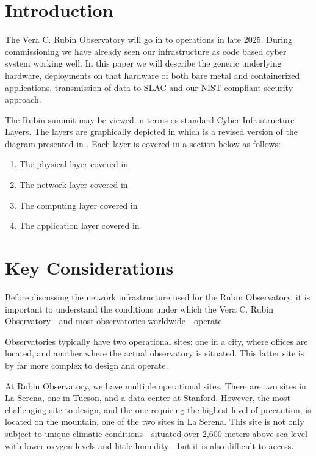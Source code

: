\section{Introduction}

The Vera C. Rubin Observatory\cite{2019ApJ...873..111I} will go in to operations in late 2025.
During commissioning we have already seen our infrastructure as code based cyber system working well.
In this paper we will describe the generic underlying hardware, deployments on that hardware of both bare metal and containerized applications, transmission of data to SLAC and our NIST\cite{NIST.SP.800-171} compliant security approach.

The Rubin summit may be viewed in terms os standard Cyber Infrastructure Layers.
The layers are graphically depicted in  which is a revised version of the diagram presented in \cite{2019arXiv190713060O}.
Each layer is covered in a section below as follows:

\begin{enumerate}
\item The physical layer covered in 
\item The network layer covered in 
\item The computing layer covered in 
\item The application layer covered in 
\end{enumerate}

\section{Key Considerations}
Before discussing the network infrastructure used for the Rubin Observatory, it is important to understand the conditions under which the Vera C. Rubin Observatory—and most observatories worldwide—operate.

Observatories typically have two operational sites: one in a city, where offices are located, and another where the actual observatory is situated. This latter site is by far more complex to design and operate.

At Rubin Observatory, we have multiple operational sites. There are two sites in La Serena, one in Tucson, and a data center at Stanford. However, the most challenging site to design, and the one requiring the highest level of precaution, is located on the mountain, one of the two sites in La Serena. This site is not only subject to unique climatic conditions—situated over 2,600 meters above sea level with lower oxygen levels and little humidity—but it is also difficult to access.

